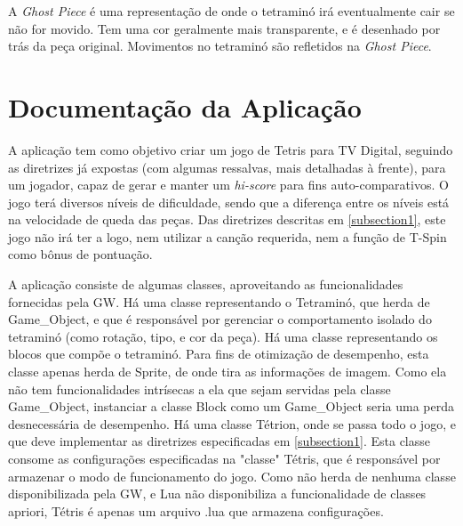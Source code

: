 \documentclass[
	12pt,				%
	openright,			%
	oneside,			%
	a4paper,			%
	brazil,				%
	]{abntex2}
\begin{document}
A \textit{Ghost Piece} é uma representação de onde o tetraminó irá eventualmente cair se não for movido. Tem uma cor geralmente mais transparente, e é desenhado por trás da peça original. Movimentos no tetraminó são refletidos na \textit{Ghost Piece}.

\section{Documentação da Aplicação}

A aplicação tem como objetivo criar um jogo de Tetris para TV Digital, seguindo as diretrizes já expostas (com algumas ressalvas, mais detalhadas à frente), para um jogador, capaz de gerar e manter um \textit{hi-score} para fins auto-comparativos. O jogo terá diversos níveis de dificuldade, sendo que a diferença entre os níveis está na velocidade de queda das peças. Das diretrizes descritas em \ref{subsection1}, este jogo não irá ter a logo, nem utilizar a canção requerida, nem a função de T-Spin como bônus de pontuação.

A aplicação consiste de algumas classes, aproveitando as funcionalidades fornecidas pela GW. Há uma classe representando o Tetraminó, que herda de Game\_Object, e que é responsável por gerenciar o comportamento isolado do tetraminó (como rotação, tipo, e cor da peça). Há uma classe representando os blocos que compõe o tetraminó. Para fins de otimização de desempenho, esta classe apenas herda de Sprite, de onde tira as informações de imagem. Como ela não tem funcionalidades intrísecas a ela que sejam servidas pela classe Game\_Object, instanciar a classe Block como um Game\_Object seria uma perda desnecessária de desempenho. Há uma classe Tétrion, onde se passa todo o jogo, e que deve implementar as diretrizes especificadas em \ref{subsection1}. Esta classe consome as configurações especificadas na "classe" Tétris, que é responsável por armazenar o modo de funcionamento do jogo. Como não herda de nenhuma classe disponibilizada pela GW, e Lua não disponibiliza a funcionalidade de classes apriori, Tétris é apenas um arquivo .lua que armazena configurações. 
\end{document}
